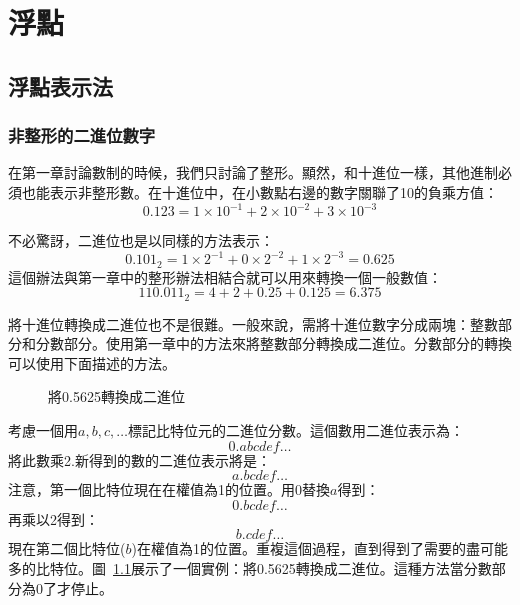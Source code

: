 \chapter{浮點}

\section{浮點表示法}

\subsection{非整形的二進位數字}

在第一章討論數制的時候，我們只討論了整形。顯然，和十進位一樣，其他進制必須也能表示非整形數。在十進位中，在小數點右邊的數字關聯了10的負乘方值：
\[ 0.123 = 1 \times 10^{-1} + 2 \times 10^{-2} + 3 \times 10^{-3} \]

不必驚訝，二進位也是以同樣的方法表示：
\[ 0.101_2 = 1 \times 2^{-1} + 0 \times 2^{-2} + 1 \times 2^{-3} = 0.625 \]
這個辦法與第一章中的整形辦法相結合就可以用來轉換一個一般數值：
\[ 110.011_2 = 4 + 2 + 0.25 + 0.125 = 6.375 \]

將十進位轉換成二進位也不是很難。一般來說，需將十進位數字分成兩塊：整數部分和分數部分。使用第一章中的方法來將整數部分轉換成二進位。分數部分的轉換可以使用下面描述的方法。

\begin{figure}[t]
\centering
{}
\caption{將0.5625轉換成二進位\label{fig:binConvert1}}
\end{figure}

考慮一個用$a, b, c, \ldots$標記比特位元的二進位分數。這個數用二進位表示為：
\[ 0.abcdef\ldots \]
將此數乘2.新得到的數的二進位表示將是：
\[ a.bcdef\ldots \]
注意，第一個比特位現在在權值為1的位置。用$0$替換$a$得到：
\[ 0.bcdef\ldots \]
再乘以2得到：
\[ b.cdef\ldots \]
現在第二個比特位($b$)在權值為1的位置。重複這個過程，直到得到了需要的盡可能多的比特位。圖~\ref{fig:binConvert1}展示了一個實例：將0.5625轉換成二進位。這種方法當分數部分為0了才停止。

